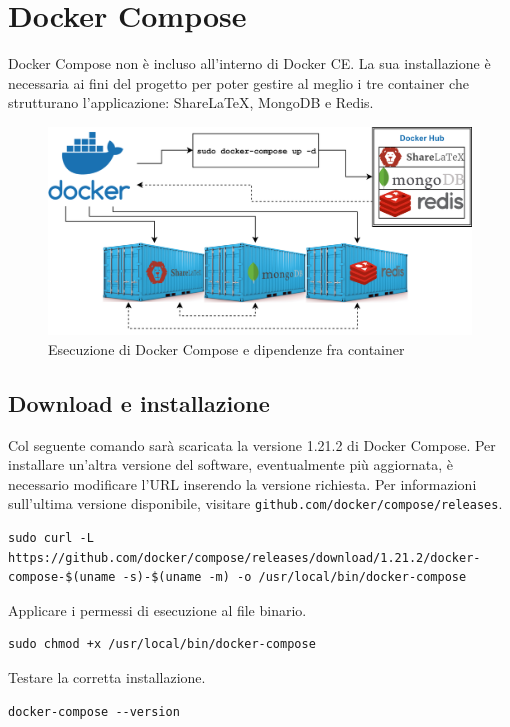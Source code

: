 \section{Docker Compose}
Docker Compose non è incluso all'interno di Docker CE. La sua installazione è necessaria ai fini del progetto per poter gestire al meglio i tre container che strutturano l'applicazione: ShareLaTeX, MongoDB e Redis.
\begin{figure}[h]
    \centering
    \includegraphics[scale=0.1]{immagini/docker_container_dependencies.png}
    \caption{Esecuzione di Docker Compose e dipendenze fra container}
    \label{fig:docker_compose_dipendenze}
\end{figure}

\subsection{Download e installazione}
Col seguente comando sarà scaricata la versione 1.21.2 di Docker Compose. Per installare un'altra versione del software, eventualmente più aggiornata, è necessario modificare l'URL inserendo la versione richiesta. Per informazioni sull'ultima versione disponibile, visitare \verb|github.com/docker/compose/releases|.
\begin{lstlisting}
sudo curl -L https://github.com/docker/compose/releases/download/1.21.2/docker-compose-$(uname -s)-$(uname -m) -o /usr/local/bin/docker-compose
\end{lstlisting}
Applicare i permessi di esecuzione al file binario.
\begin{lstlisting}
sudo chmod +x /usr/local/bin/docker-compose
\end{lstlisting}
Testare la corretta installazione.
\begin{lstlisting}
docker-compose --version
\end{lstlisting}

